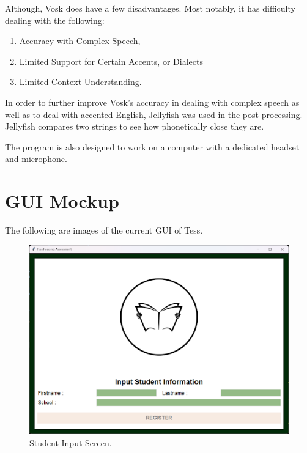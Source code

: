 Although, Vosk does have a few disadvantages. Most notably, it has difficulty dealing with the following:
\begin{enumerate}
    \item Accuracy with Complex Speech,
    \item Limited Support for Certain Accents, or Dialects
    \item Limited Context Understanding.
\end{enumerate}

In order to further improve Vosk’s accuracy in dealing with complex speech as well as to deal with accented English, Jellyfish was used in the post-processing. Jellyfish compares two strings to see how phonetically close they are.

The program is also designed to work on a computer with a dedicated headset and microphone.

{\clearpage}
\section{GUI Mockup}
The following are images of the current GUI of Tess.

\begin{figure}[h]
   \centering
   \includegraphics[scale = 0.6]{figures/Student-Input-Screen.png}
   \caption{Student Input Screen.}
    \label{fig:studentInput}
\end{figure}

